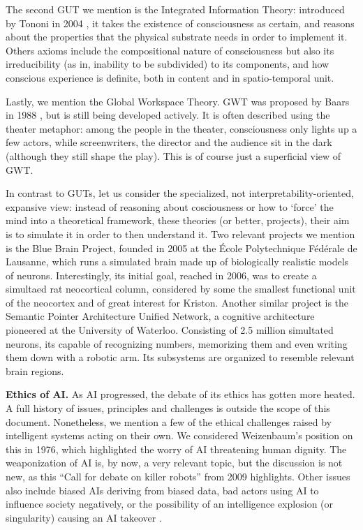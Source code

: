 \documentclass[../main.tex]{subfiles}
\begin{document}
The second GUT we mention is the Integrated Information Theory: introduced by Tononi in 2004 \parencite{tononiInformationIntegrationTheory2004}, it takes the existence of consciousness as certain, and reasons about the properties that the physical substrate needs in order to implement it. Others axioms include the compositional nature of consciousness but also its irreducibility (as in, inability to be subdivided) to its components, and how conscious experience is definite, both in content and in spatio-temporal unit.

Lastly, we mention the Global Workspace Theory. GWT was proposed by Baars in 1988 \parencite{baarsCognitiveTheoryConsciousness1988}, but is still being developed actively. It is often described using the theater metaphor: among the people in the theater, consciousness only lights up a few actors, while screenwriters, the director and the audience sit in the dark (although they still shape the play). This is of course just a superficial view of GWT.

In contrast to GUTs, let us consider the specialized, not interpretability-oriented, expansive view: instead of reasoning about cosciousness or how to `force' the mind into a theoretical framework, these theories (or better, projects), their aim is to simulate it in order to then understand it. Two relevant projects we mention is the Blue Brain Project, founded in 2005 at the École Polytechnique Fédérale de Lausanne, which runs a  simulated brain made up of biologically realistic models of neurons. Interestingly, its initial goal, reached in 2006, was to create a simultaed rat neocortical column, considered by some the smallest functional unit of the neocortex and of great interest for Kriston. Another similar project is the Semantic Pointer Architecture Unified Network, a cognitive architecture pioneered at the University of Waterloo. Consisting of 2.5 million simultated neurons, its capable of recognizing numbers, memorizing them and even writing them down with a robotic arm. Its subsystems are organized to resemble relevant brain regions.

\textbf{Ethics of AI.} As AI progressed, the debate of its ethics has gotten more heated. A full history of issues, principles and challenges is outside the scope of this document. Nonetheless, we mention a few of the ethical challenges raised by intelligent systems acting on their own. We considered Weizenbaum's position on this in 1976, which highlighted the worry of AI threatening human dignity. The weaponization of AI is, by now, a very relevant topic, but the discussion is not new, as this ``Call for debate on killer robots'' \parencite{BBCNEWSTechnology} from 2009 highlights. Other issues also include biased AIs deriving from biased data, bad actors using AI to influence society negatively, or the possibility of an intelligence explosion (or singularity) causing an AI takeover \parencite{bostromEthicalIssuesAdvanced2003}.
\end{document}
